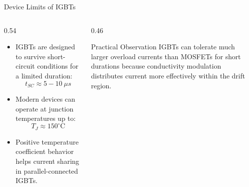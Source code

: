 \begin{frame}{Device Limits of IGBTs}
\begin{columns}
\begin{column}{0.54\textwidth}
\begin{itemize}   
    \item IGBTs are designed to survive short-circuit conditions for a limited duration:
    \[
        t_{SC} \approx 5{-}10~\mu s
    \]
    
    \item Modern devices can operate at junction temperatures up to:
    \[
        T_J \approx 150^\circ\text{C}
    \]
    
    \item Positive temperature coefficient behavior helps current sharing in parallel-connected IGBTs.
\end{itemize}
\end{column}

\begin{column}{0.46\textwidth}

\begin{block}{Practical Observation}
IGBTs can tolerate much larger overload currents than MOSFETs for short durations because conductivity modulation distributes current more effectively within the drift region.
\end{block}
\end{column}
\end{columns}
\end{frame}



